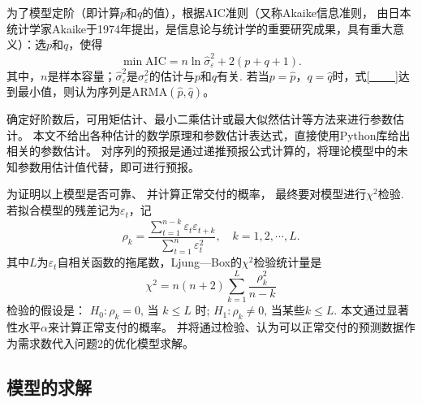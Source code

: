 为了模型定阶（即计算$p$和$q$的值），根据AIC准则（又称Akaike信息准则， 由日本统计学家Akaike于1974年提出，是信息论与统计学的重要研究成果，具有重大意义\cite{张波2004应用随机过程}）：选$p$和$q$，使得
\begin{equation}\label{___}
	\min \mathrm{AIC}=n \ln \hat{\sigma}_{\varepsilon}^{2}+2(p+q+1).
\end{equation}
其中，$n$是样本容量；$\hat{\sigma}_{\varepsilon}^{2}$是${\sigma}_{\varepsilon}^{2}$的估计与$p$和$q$有关. 若当$p = \hat{p}，q = \hat{q}$时，式\ref{___}达到最小值，则认为序列是ARMA$(\hat{p}, \hat{q})$。

确定好阶数后，可用矩估计、最小二乘估计或最大似然估计等方法来进行参数估计。
本文不给出各种估计的数学原理和参数估计表达式，直接使用Python库给出相关的参数估计。
对序列的预报是通过递推预报公式计算的，将理论模型中的未知参数用估计值代替，即可进行预报\cite{胡运权2003运筹学教程}。

为证明以上模型是否可靠、 并计算正常交付的概率， 最终要对模型进行$\chi^{2}$检验. 若拟合模型的残差记为$\varepsilon_{t}$，记
\begin{equation}
	\rho_{k}=\frac{\sum_{t=1}^{n-k} \varepsilon_{t} \varepsilon_{t+k}}{\sum_{t=1}^{n} \varepsilon_{t}^{2}},\quad k=1,2, \cdots, L.
\end{equation}
其中$L$为$\varepsilon_{t}$自相关函数的拖尾数，Ljung—Box的$\chi^{2}$检验统计量是
\begin{equation}
	\chi^{2}=n(n+2) \sum_{k=1}^{L} \frac{\rho_{k}^{2}}{n-k}
\end{equation}
检验的假设是： $H_{0}: \rho_{k}=0 \text {, 当 } k \leqslant L \text { 时; } H_{1}: \rho_{k} \neq 0 \text {, 当某些}k\leqslant L.$
本文通过显著性水平$\alpha$来计算正常支付的概率。 并将通过检验、认为可以正常交付的预测数据作为需求数代入问题2的优化模型求解。

\subsection{模型的求解} %
\label{sub:模型的求解}


